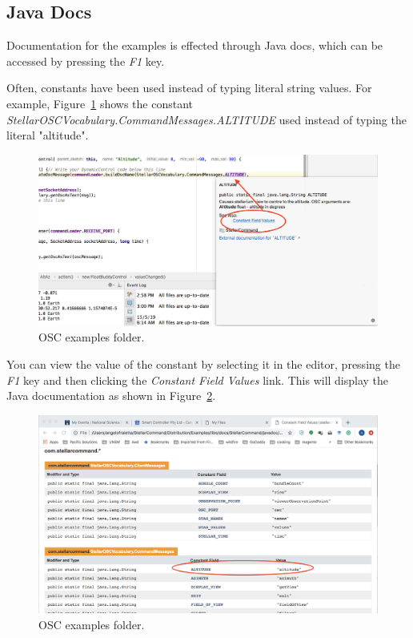 \subsection{Java Docs} 
Documentation for the examples is effected through Java docs, which can be accessed by pressing the \textit{F1} key. 

 Often, constants have been used instead of typing literal string values. For example, Figure~\ref{fig:exampleConstantShow} shows the constant \textit{StellarOSCVocabulary.CommandMessages.ALTITUDE} used instead of typing the literal "altitude". 
\begin{figure}[htbp]
	\centering
	\includegraphics[width=1\columnwidth]{exampleConstantShow}
	\caption{OSC examples folder.}
	\label{fig:exampleConstantShow}
\end{figure}
You can view the value of the constant by selecting it in the editor, pressing the \textit{F1} key and then clicking the \textit{Constant Field Values} link. This will display the Java documentation as shown in Figure~\ref{fig:constantDisplay}.

\begin{figure}[htbp]
	\centering
	\includegraphics[width=1\columnwidth]{constantDisplay}
	\caption{OSC examples folder.}
	\label{fig:constantDisplay}
\end{figure}

